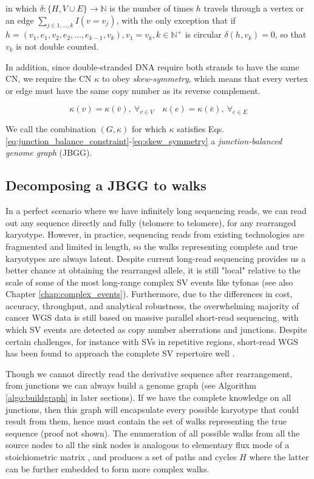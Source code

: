 \documentclass[phd,tocprelim]{cornell}
\begin{document}
in which $\delta: \{H, V \cup E\} \rightarrow \mathbb{N}$ is the number of times $h$ travels through a vertex or an edge $\sum_{j \in 1,\dots,k}I(v = v_j)$, with the only exception that if $h = (v_1, e_1, v_2, e_2, \dots, e_{k-1}, v_k), v_1=v_k, k \in \mathbb{N^+}$ is circular $\delta(h,v_k) = 0$, so that $v_k$ is not double counted.

In addition, since double-stranded DNA require both strands to have the same CN, we require the CN $\kappa$ to obey \textit{skew-symmetry}, which means that every vertex or edge must have the same copy number as its reverse complement.

\begin{equation} \label{eq:skew_symmetry}
    \kappa(v) = \kappa(\bar{v}),\ \forall_{v \in V} \quad \kappa(e) = \kappa(\bar{e}),\ \forall_{e \in E}
\end{equation}

We call the combination $(G,\kappa)$ for which $\kappa$ satisfies Eqs. \ref{eq:junction_balance_constraint}-\ref{eq:skew_symmetry} a \textit{junction-balanced genome graph} (JBGG).

\subsection{Decomposing a JBGG to walks}
In a perfect scenario where we have infinitely long sequencing reads, we can read out any sequence directly and fully (telomere to telomere), for any rearranged karyotype. However, in practice, sequencing reads from existing technologies are fragmented and limited in length, so the walks representing complete and true karyotypes are always latent. Despite current long-read sequencing provides us a better chance at obtaining the rearranged allele, it is still "local" relative to the scale of some of the most long-range complex SV events like tyfonas \cite{Hadi2020-um} (see also Chapter \ref{chap:complex_events}). Furthermore, due to the differences in cost, accuracy, throughput, and analytical robustness, the overwhelming majority of cancer WGS data is still based on massive parallel short-read sequencing, with which SV events are detected as copy number aberrations and junctions. Despite certain challenges, for instance with SVs in repetitive regions, short-read WGS has been found to approach the complete SV repertoire well \cite{Behr2021-gf}.

Though we cannot directly read the derivative sequence after rearrangement, from junctions we can always build a genome graph (see Algorithm \ref{algo:buildgraph} in later sections). If we have the complete knowledge on all junctions, then this graph will encapsulate every possible karyotype that could result from them, hence must contain the set of walks representing the true sequence (proof not shown). The enumeration of all possible walks from all the source nodes to all the sink nodes is analogous to elementary flux mode of a stoichiometric matrix \cite{Maarleveld2013}, and produces a set of paths and cycles $H$ where the latter can be further embedded to form more complex walks.
\end{document}
